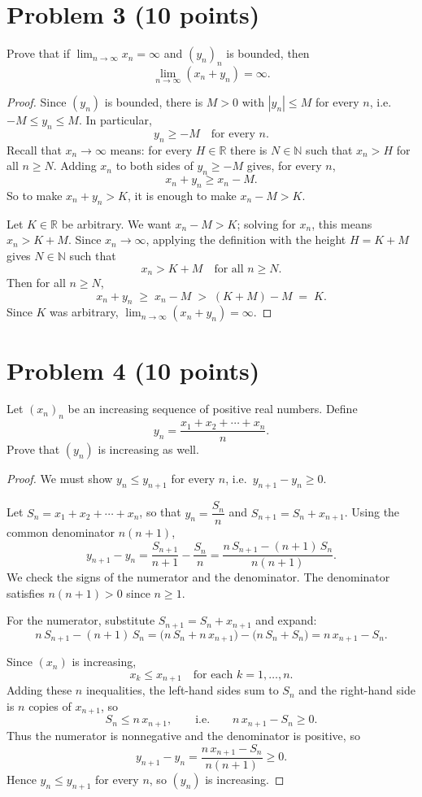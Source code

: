 \documentclass[11pt]{article}
\begin{document}
\section*{Problem 3 (10 points)}
Prove that if $\displaystyle\lim_{n\to\infty}x_n=\infty$ and $(y_n)_n$ is
bounded, then
\[
  \lim_{n\to\infty}(x_n+y_n)=\infty .
\]

\begin{proof}
Since $(y_n)$ is bounded, there is $M>0$ with $|y_n|\le M$ for every
$n$, i.e.\ $-M\le y_n\le M$. In particular,
\[
  y_n \ge -M \quad\text{for every } n .
\]
Recall that $x_n\to\infty$ means: for every $H\in\mathbb{R}$ there is
$N\in\mathbb{N}$ such that $x_n > H$ for all $n\ge N$.
Adding $x_n$ to both sides of $y_n\ge -M$ gives, for every $n$,
\[
  x_n + y_n \ge x_n - M .
\]
So to make $x_n+y_n > K$, it is enough to make $x_n - M > K$.

Let $K\in\mathbb{R}$ be arbitrary.
We want $x_n - M > K$; solving for $x_n$, this means $x_n > K + M$.
Since $x_n\to\infty$, applying the definition with the height $H = K+M$
gives $N\in\mathbb{N}$ such that
\[
  x_n > K + M \quad\text{for all } n\ge N .
\]
Then for all $n\ge N$,
\[
  x_n + y_n \;\ge\; x_n - M \;>\; (K+M) - M \;=\; K .
\]
Since $K$ was arbitrary, $\displaystyle\lim_{n\to\infty}(x_n+y_n)=\infty$.

\end{proof}

\section*{Problem 4 (10 points)}
Let $(x_n)_n$ be an increasing sequence of positive real numbers. Define
\[
  y_n=\frac{x_1+x_2+\cdots+x_n}{n}.
\]
Prove that $(y_n)$ is increasing as well.

\begin{proof}
We must show $y_n \le y_{n+1}$ for every $n$, i.e.\
$y_{n+1} - y_n \ge 0$.

Let $S_n = x_1 + x_2 + \cdots + x_n$, so that $y_n = \dfrac{S_n}{n}$ and
$S_{n+1} = S_n + x_{n+1}$. Using the common denominator $n(n+1)$,
\[
  y_{n+1} - y_n
  = \frac{S_{n+1}}{n+1} - \frac{S_n}{n}
  = \frac{n\,S_{n+1} - (n+1)\,S_n}{n(n+1)} .
\]
We check the signs of the numerator and the denominator. The denominator
satisfies $n(n+1) > 0$ since $n \ge 1$.

For the numerator, substitute $S_{n+1} = S_n + x_{n+1}$ and expand:
\[
  n\,S_{n+1} - (n+1)\,S_n
  = \bigl(n\,S_n + n\,x_{n+1}\bigr) - \bigl(n\,S_n + S_n\bigr)
  = n\,x_{n+1} - S_n .
\]

Since $(x_n)$ is increasing,
\[
  x_k \le x_{n+1} \quad\text{for each } k = 1, \ldots, n .
\]
Adding these $n$ inequalities, the left-hand sides sum to $S_n$ and the
right-hand side is $n$ copies of $x_{n+1}$, so
\[
  S_n \le n\,x_{n+1}, \qquad\text{i.e.}\qquad n\,x_{n+1} - S_n \ge 0 .
\]
Thus the numerator is nonnegative and the denominator is positive, so
\[
  y_{n+1} - y_n = \frac{n\,x_{n+1} - S_n}{n(n+1)} \ge 0 .
\]
Hence $y_n \le y_{n+1}$ for every $n$, so $(y_n)$ is increasing.

\end{proof}
\end{document}
